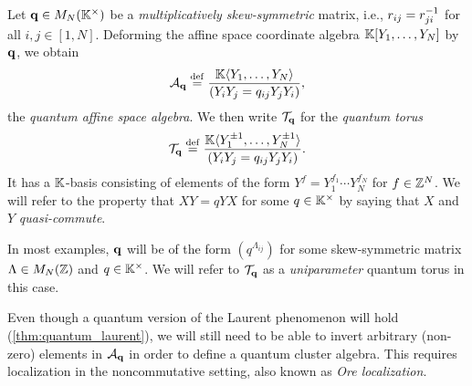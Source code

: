 Let $\mathbf{q} \in M_N(\mathbb{K}^\times)$ be a \emph{multiplicatively
	skew-symmetric} matrix, i.e., $r_{ij} =
	r_{ji}^{-1}$ for all $i,j \in [1, N]$. Deforming the affine space coordinate algebra
$\mathbb{K}[Y_1, \dots, Y_N]$ by $\mathbf{q}$, we obtain
\begin{equation*}
	\mathcal{A}_{\mathbf{q}} \overset{\mathrm{def}}{=} \frac{\mathbb{K} \langle Y_1 , \dots, Y_N\rangle}{(Y_i Y_j = q_{ij}Y_j Y_i)},
\end{equation*}
%
%
the \emph{quantum affine space algebra}. We then
write $\mathcal{T}_{\mathbf{q}}$ for the \emph{quantum torus}
\begin{equation}\label{eq:quantum_torus}
	\mathcal{T}_{\mathbf{q}} \overset{\mathrm{def}}{=} \frac{\mathbb{K} \langle Y_1^{\pm 1} , \dots, Y_N^{\pm 1}\rangle}{(Y_i Y_j = q_{ij}Y_j Y_i)}.
\end{equation}
%
It has a $\mathbb{K}$-basis consisting of elements of the form $Y^f = Y_1^{f_1} \cdots
	Y_N^{f_N}$ for $f \in \mathbb{Z}^N$. We will refer to the property that $X Y = qY X$ for some
$q \in \mathbb{K}^\times$ by saying that $X$ and $Y$
\emph{quasi-commute}.
\begin{remark}

	In most examples, $\mathbf{q}$ will be of the form $(q^{\Lambda_{ij}})$ for some
	skew-symmetric matrix $\Lambda \in M_N(\mathbb{Z})$ and $q\in \mathbb{K}^\times$. We will refer to
	$\mathcal{T}_{\mathbf{q}}$ as a \emph{uniparameter} quantum torus in this case.
\end{remark}
%

Even though a quantum version of the Laurent phenomenon will hold
(\cref{thm:quantum_laurent}), we will still need to be able to invert arbitrary
(non-zero) elements in $\mathcal{A}_{\mathbf{q}}$ in order to define a quantum cluster algebra. This
requires localization in the noncommutative setting, also known as \emph{Ore
	localization}.

